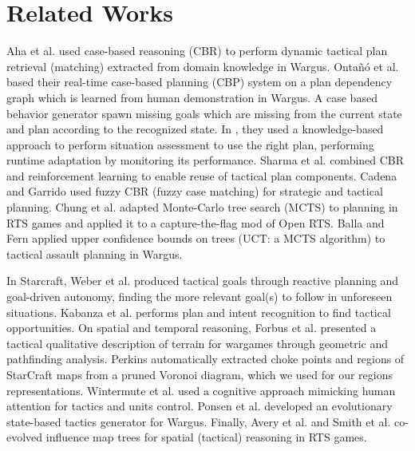 \section{Related Works}
Aha et al. \cite{LTW} used case-based reasoning (CBR) to perform dynamic tactical plan retrieval (matching) extracted from domain knowledge in Wargus. Onta\~{n}\'{o} et al. \cite{Ontanon07} based their real-time case-based planning (CBP) system on a plan dependency graph which is learned from human demonstration in Wargus. A case based behavior generator spawn missing goals which are missing from the current state and plan according to the recognized state. In \cite{PlanRetrieval,meta-rts}, they used a knowledge-based approach to perform situation assessment to use the right plan, performing runtime adaptation by monitoring its performance. Sharma et al. \cite{CBR-RL} combined CBR and reinforcement learning to enable reuse of tactical plan components. Cadena and Garrido \cite{CadenaG11} used fuzzy CBR (fuzzy case matching) for strategic and tactical planning. Chung et al. \cite{Chung05} adapted Monte-Carlo tree search (MCTS) to planning in RTS games and applied it to a capture-the-flag mod of Open RTS. Balla and Fern \cite{Balla_uctfor} applied upper confidence bounds on trees (UCT: a MCTS algorithm) to tactical assault planning in Wargus. 

In Starcraft, Weber et al. \cite{Weber2010cr,WeberCIG10} produced tactical goals through reactive planning and goal-driven autonomy, finding the more relevant goal(s) to follow in unforeseen situations. Kabanza et al. \cite{OBRecog} performs plan and intent recognition to find tactical opportunities. %
On spatial and temporal reasoning, Forbus et al. \cite{Forbus2002} presented a tactical qualitative description of terrain for wargames through geometric and pathfinding analysis. Perkins \cite{Perkins2010} automatically extracted choke points and regions of StarCraft maps from a pruned Voronoi diagram, which we used for our regions representations. Wintermute et al. \cite{SORTS} used a cognitive approach mimicking human attention for tactics and units control. Ponsen et al. \cite{PonsenMSA06} developed an evolutionary state-based tactics generator for Wargus. %
Finally, Avery et al. \cite{Avery09} and Smith et al. \cite{SmithCIG10} co-evolved influence map trees for spatial (tactical) reasoning in RTS games. 

